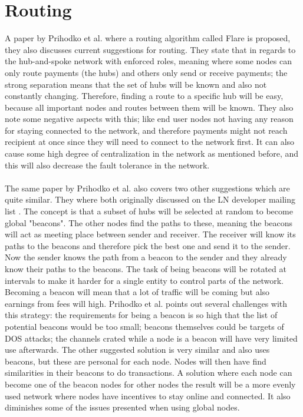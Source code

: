 \documentclass[informationsecurity]{gucmasterproject}
\begin{document}
\section{Routing}
A paper by Prihodko et al. where a routing algorithm called Flare\cite{prihodko2016flare} is proposed, they also discusses current suggestions for routing. 
They state that in regards to the hub-and-spoke network with enforced roles, meaning where some nodes can only route payments (the hubs) and others only send or receive payments; the strong separation means that the set of hubs will be known and also not constantly changing. Therefore, finding a route to a specific hub will be easy, because all important nodes and routes between them will be known.
They also note some negative aspects with this; like 
end user nodes not having any reason for staying connected to the network, and therefore payments might not reach recipient at once since they will need to connect to the network first.
It can also cause some high degree of centralization in the network as mentioned before, and this will also decrease the fault tolerance in the network.

\paragraph{}
The  same paper by Prihodko et al.\cite{prihodko2016flare} also covers two other suggestions which are quite similar.
They where both originally discussed on the LN developer mailing list\cite{rusty_routing1} \cite{rusty_routing2} \cite{rusty_routing3}. The concept is that a subset of hubs will be selected at random to become global "beacons". The other nodes find the paths to these, meaning the beacons will act as meeting place between sender and receiver. The receiver will know its paths to the beacons and therefore pick the best one and send it to the sender. Now the sender knows the path from a beacon to the sender and they already know their paths to the beacons. The task of being beacons will be rotated at intervals to make it harder for a single entity to control parts of the network. Becoming a beacon will mean that a lot of traffic will be coming but also earnings from fees will high.
Prihodko et al. points out several challenges with this strategy: the requirements for being a beacon is so high that the list of potential beacons would be too small; beacons themselves could be targets of DOS attacks; the channels crated while a node is a beacon will have very limited use afterwards. The other suggested solution is very similar and also uses beacons, but these are personal for each node. Nodes will then have find similarities in their beacons to do transactions. A solution where each node can become one of the beacon nodes for other nodes the result will be a more evenly used network where nodes have incentives to stay online and connected. It also diminishes some of the issues presented when using global nodes.
\end{document}
